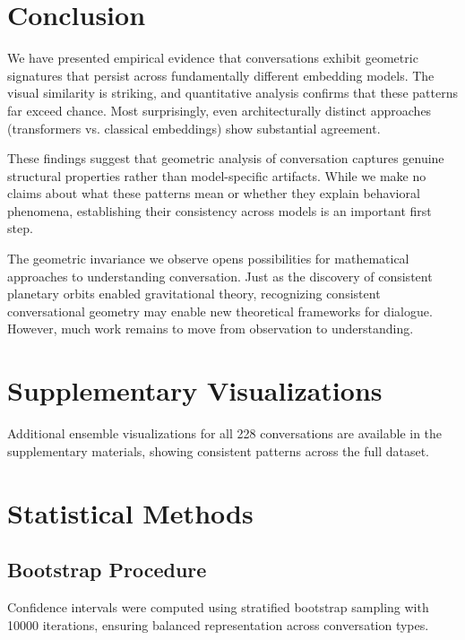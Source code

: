 \documentclass[11pt,letterpaper]{article}
\newcommand{\totalConversations}{228}
\newcommand{\bootstrapIterations}{10000}
\begin{document}
\section{Conclusion}

We have presented empirical evidence that conversations exhibit geometric signatures that persist across fundamentally different embedding models. The visual similarity is striking, and quantitative analysis confirms that these patterns far exceed chance. Most surprisingly, even architecturally distinct approaches (transformers vs. classical embeddings) show substantial agreement.

These findings suggest that geometric analysis of conversation captures genuine structural properties rather than model-specific artifacts. While we make no claims about what these patterns mean or whether they explain behavioral phenomena, establishing their consistency across models is an important first step.

The geometric invariance we observe opens possibilities for mathematical approaches to understanding conversation. Just as the discovery of consistent planetary orbits enabled gravitational theory, recognizing consistent conversational geometry may enable new theoretical frameworks for dialogue. However, much work remains to move from observation to understanding.




\appendix

\section{Supplementary Visualizations}

Additional ensemble visualizations for all \totalConversations{} conversations are available in the supplementary materials, showing consistent patterns across the full dataset.

\section{Statistical Methods}

\subsection{Bootstrap Procedure}

Confidence intervals were computed using stratified bootstrap sampling with \bootstrapIterations{} iterations, ensuring balanced representation across conversation types.
\end{document}
